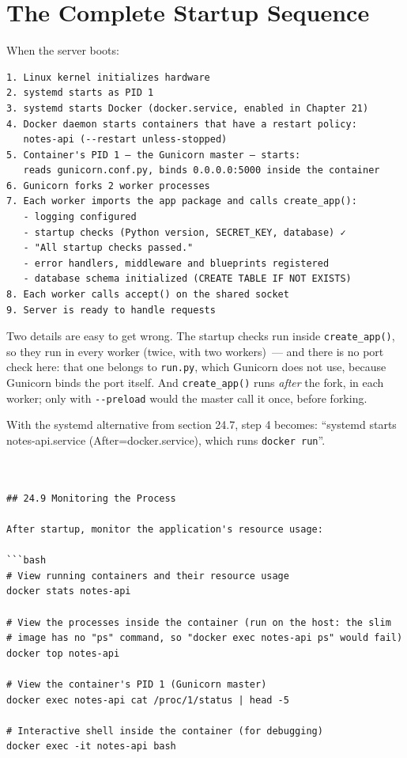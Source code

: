 \setcounter{section}{7}
\section{The Complete Startup Sequence}\label{24-process-startup:248-the-complete-startup-sequence}

When the server boots:

\begin{outputbox}[short]
\begin{Verbatim}[fontsize=\codesize, breaklines, breakanywhere, breaksymbolleft={\tiny\textcolor{muted}{$\hookrightarrow$}}]
1. Linux kernel initializes hardware
2. systemd starts as PID 1
3. systemd starts Docker (docker.service, enabled in Chapter 21)
4. Docker daemon starts containers that have a restart policy:
   notes-api (--restart unless-stopped)
5. Container's PID 1 — the Gunicorn master — starts:
   reads gunicorn.conf.py, binds 0.0.0.0:5000 inside the container
6. Gunicorn forks 2 worker processes
7. Each worker imports the app package and calls create_app():
   - logging configured
   - startup checks (Python version, SECRET_KEY, database) ✓
   - "All startup checks passed."
   - error handlers, middleware and blueprints registered
   - database schema initialized (CREATE TABLE IF NOT EXISTS)
8. Each worker calls accept() on the shared socket
9. Server is ready to handle requests
\end{Verbatim}
\end{outputbox}

\noindent{}Two details are easy to get wrong. The startup checks run inside \texttt{create\_app()}, so they run in every worker (twice, with two workers)~--- and there is no port check here: that one belongs to \texttt{run.py}, which Gunicorn does not use, because Gunicorn binds the port itself. And \texttt{create\_app()} runs \emph{after} the fork, in each worker; only with \texttt{-\/-preload} would the master call it once, before forking.

With the systemd alternative from section 24.7, step 4 becomes: ``systemd starts notes-api.service (After=docker.service), which runs \texttt{docker\ run}''.

\begin{outputbox}
\begin{Verbatim}[fontsize=\codesize, breaklines, breakanywhere, breaksymbolleft={\tiny\textcolor{muted}{$\hookrightarrow$}}]


## 24.9 Monitoring the Process

After startup, monitor the application's resource usage:

```bash
# View running containers and their resource usage
docker stats notes-api

# View the processes inside the container (run on the host: the slim
# image has no "ps" command, so "docker exec notes-api ps" would fail)
docker top notes-api

# View the container's PID 1 (Gunicorn master)
docker exec notes-api cat /proc/1/status | head -5

# Interactive shell inside the container (for debugging)
docker exec -it notes-api bash
\end{Verbatim}
\end{outputbox}

